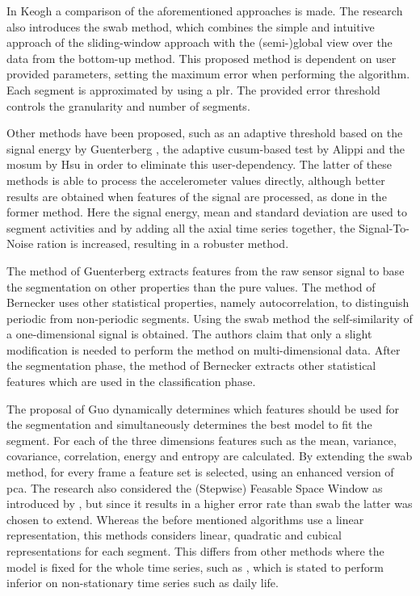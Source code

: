 In Keogh \etal \cite{keogh2001online} a comparison of the aforementioned approaches is made.
The research also introduces the \gls{swab} method, which combines the simple and intuitive approach of the sliding-window approach with the (semi-)global view over the data from the bottom-up method.
This proposed method is dependent on user provided parameters, setting the maximum error when performing the algorithm.
Each segment is approximated by using a \gls{plr}.
The provided error threshold controls the granularity and number of segments.

Other methods have been proposed, such as an adaptive threshold based on the signal energy by Guenterberg \etal \cite{guenterberg2009automatic}, the adaptive \gls{cusum}-based test by Alippi \etal \cite{alippi2006adaptive} and the \gls{mosum} by Hsu \cite{hsu2007mosum} in order to eliminate this user-dependency.
The latter of these methods is able to process the accelerometer values directly, although better results are obtained when features of the signal are processed, as done in the former method.
Here the signal energy, mean and standard deviation are used to segment activities and by adding all the axial time series together, the Signal-To-Noise ration is increased, resulting in a robuster method.

The method of Guenterberg \etal extracts features from the raw sensor signal to base the segmentation on other properties than the pure values.
The method of Bernecker \etal \cite{bernecker2012activity} uses other statistical properties, namely autocorrelation, to distinguish periodic from non-periodic segments.
Using the \gls{swab} method the self-similarity of a one-dimensional signal is obtained.
The authors claim that only a slight modification is needed to perform the method on multi-dimensional data.
After the segmentation phase, the method of Bernecker \etal extracts other statistical features which are used in the classification phase.

The proposal of Guo \etal \cite{guo2012adaptive} dynamically determines which features should be used for the segmentation and simultaneously determines the best model to fit the segment.
For each of the three dimensions features such as the mean, variance, covariance, correlation, energy and entropy are calculated.
By extending the \gls{swab} method, for every frame a feature set is selected, using an enhanced version of \gls{pca}.
The research also considered the (Stepwise) Feasable Space Window as introduced by \cite{liu2008novel}, but since it results in a higher error rate than \gls{swab} the latter was chosen to extend.
Whereas the before mentioned algorithms use a linear representation, this methods considers linear, quadratic and cubical representations for each segment.
This differs from other methods where the model is fixed for the whole time series, such as \cite{fuchs2010online}, which is stated to perform inferior on non-stationary time series such as daily life.

